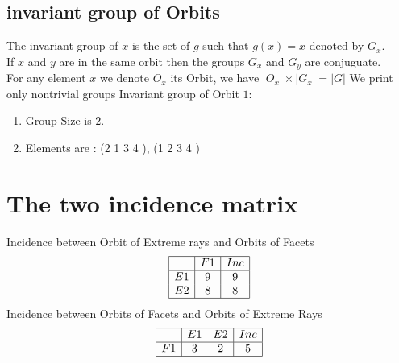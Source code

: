 \documentclass[12pt]{article}
\begin{document}
\subsection{invariant group of Orbits}
\noindent The invariant group of $x$ is the set of $g$ such that $g(x)=x$ denoted by $G_x$.\\
If $x$ and $y$ are in the same orbit then the groups $G_x$ and  $G_y$ are conjuguate.\\
For any element $x$ we denote $O_x$ its Orbit, we have $|O_x|\times |G_x|=|G|$
We print only nontrivial groups
Invariant group of Orbit $1$:
\begin{enumerate}
\item Group Size is $2$.
\item Elements are : (2 1 3 4  ), (1 2 3 4  )
\end{enumerate}
\section{The two incidence matrix}
Incidence between Orbit of Extreme rays and Orbits of Facets
\begin{equation*}
\begin{array}{|c|c|c|}
\hline
&F1&Inc\\
\hline
E1&9&9\\
E2&8&8\\
\hline
\end{array}
\end{equation*}
Incidence between Orbits of Facets and Orbits of Extreme Rays
\begin{equation*}
\begin{array}{|c|cc|c|}
\hline
&E1&E2&Inc\\
\hline
F1&3&2&5\\
\hline
\end{array}
\end{equation*}
\end{document}
